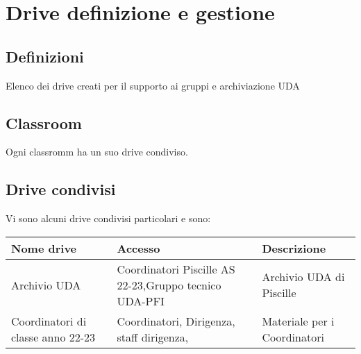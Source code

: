 \chapter{Drive definizione e gestione}
\section{Definizioni}
Elenco dei drive creati per il supporto ai gruppi e archiviazione UDA
\section{Classroom}
Ogni classromm  ha un suo drive condiviso.
\section{Drive condivisi}
Vi sono alcuni drive condivisi particolari e sono:

\begin{center}
	\begin{tabular}{p{3.2cm}p{3.2cm}p{3.2cm}}
\toprule
Nome drive	& Accesso &  Descrizione \\
\midrule
Archivio UDA\index{UDA!Archivio}	& Coordinatori Piscille AS 22-23,Gruppo tecnico UDA-PFI & Archivio UDA di Piscille \\
Coordinatori di classe anno 22-23&Coordinatori, Dirigenza, staff dirigenza, &Materiale per i Coordinatori\\
\bottomrule
\end{tabular}
\end{center}
